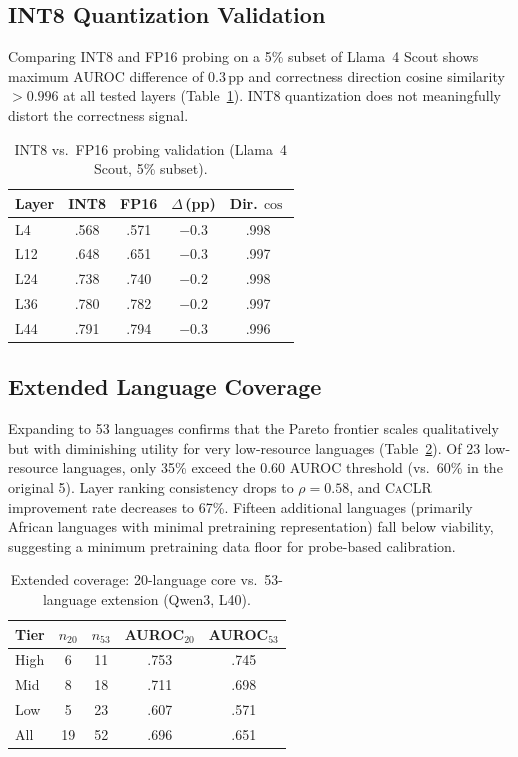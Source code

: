\documentclass[11pt,a4paper]{article}
\newcommand{\caclr}{\textsc{CaCLR}}
\begin{document}
\subsection{INT8 Quantization Validation}
\label{sec:int8}

Comparing INT8 and FP16 probing on a 5\% subset of Llama~4 Scout shows maximum AUROC difference of 0.3\,pp and correctness direction cosine similarity $> 0.996$ at all tested layers (Table~\ref{tab:int8}).
INT8 quantization does not meaningfully distort the correctness signal.

\begin{table}[t]
\centering
\small
\caption{INT8 vs.\ FP16 probing validation (Llama~4 Scout, 5\% subset).}
\label{tab:int8}
\begin{tabular}{lcccc}
\toprule
Layer & INT8 & FP16 & $\Delta$\,(pp) & Dir.\,$\cos$ \\
\midrule
L4 & .568 & .571 & $-0.3$ & .998 \\
L12 & .648 & .651 & $-0.3$ & .997 \\
L24 & .738 & .740 & $-0.2$ & .998 \\
L36 & .780 & .782 & $-0.2$ & .997 \\
L44 & .791 & .794 & $-0.3$ & .996 \\
\bottomrule
\end{tabular}
\end{table}

\subsection{Extended Language Coverage}
\label{sec:extended}

Expanding to 53 languages confirms that the Pareto frontier scales qualitatively but with diminishing utility for very low-resource languages (Table~\ref{tab:extended}).
Of 23 low-resource languages, only 35\% exceed the 0.60 AUROC threshold (vs.\ 60\% in the original 5).
Layer ranking consistency drops to $\rho = 0.58$, and \caclr{} improvement rate decreases to 67\%.
Fifteen additional languages (primarily African languages with minimal pretraining representation) fall below viability, suggesting a minimum pretraining data floor for probe-based calibration.

\begin{table}[t]
\centering
\small
\caption{Extended coverage: 20-language core vs.\ 53-language extension (Qwen3, L40).}
\label{tab:extended}
\begin{tabular}{lcccc}
\toprule
Tier & $n_{20}$ & $n_{53}$ & AUROC$_{20}$ & AUROC$_{53}$ \\
\midrule
High & 6 & 11 & .753 & .745 \\
Mid & 8 & 18 & .711 & .698 \\
Low & 5 & 23 & .607 & .571 \\
All & 19 & 52 & .696 & .651 \\
\bottomrule
\end{tabular}
\end{table}
\end{document}
